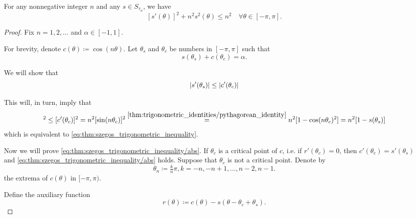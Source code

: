 \begin{theorem}\label{thm:szegos_trigonometric_inequality}
  For any nonnegative integer \( n \) and any \( s \in S_{\tau_n} \), we have
  \begin{equation}\label{eq:thm:szegos_trigonometric_inequality}
    [s'(\theta)]^2 + n^2 s^2 (\theta) \leq n^2 \quad\forall \theta \in [-\pi, \pi].
  \end{equation}
\end{theorem}
\begin{proof}
  Fix \( n = 1, 2, \ldots \) and \( \alpha \in [-1, 1] \).

  For brevity, denote \( c(\theta) \coloneqq \cos(n \theta) \). Let \( \theta_s \) and \( \theta_c \) be numbers in \( [-\pi, \pi] \) such that
  \begin{equation*}
    s(\theta_s) + c(\theta_c) = \alpha.
  \end{equation*}

  We will show that
  \begin{equation}\label{eq:thm:szegos_trigonometric_inequality/abs}
    \left\vert s'(\theta_s) \right\vert \leq \left\vert c'(\theta_c) \right\vert
  \end{equation}

  This will, in turn, imply that
  \begin{equation*}
    [s'(\theta_s)]^2
    \leq
    [c'(\theta_c)]^2
    =
    n^2 [\sin(n \theta_c)]^2
    \overset {\ref{thm:trigonometric_identities/pythagorean_identity}}
    =
    n^2 [1 - \cos(n \theta_c)^2]
    =
    n^2 [1 - s(\theta_s)]
  \end{equation*}
  which is equivalent to \eqref{eq:thm:szegos_trigonometric_inequality}.

  Now we will prove \eqref{eq:thm:szegos_trigonometric_inequality/abs}. If \( \theta_c \) is a critical point of \( c \), i.e. if \( r'(\theta_c) = 0 \), then \( c'(\theta_c) = s'(\theta_s) \) and \eqref{eq:thm:szegos_trigonometric_inequality/abs} holds. Suppose that \( \theta_c \) is not a critical point. Denote by
  \begin{equation*}
    \theta_n \coloneqq \tfrac k n \pi, k = -n, -n+1, \ldots, n-2, n-1.
  \end{equation*}
  the extrema of \( c(\theta) \) in \( [-\pi, \pi) \).

  Define the auxiliary function
  \begin{equation*}
    r(\theta) \coloneqq c(\theta) - s(\theta - \theta_c + \theta_s).
  \end{equation*}


\end{proof}
